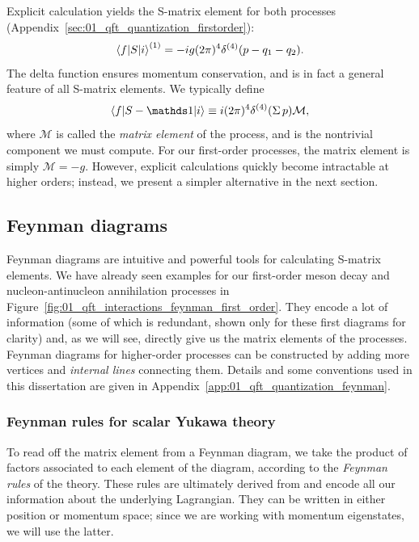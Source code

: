 Explicit calculation yields the S-matrix element for both processes (Appendix~\ref{sec:01_qft_quantization_firstorder}):
\begin{equation}
	\label{eq:01_qft_interactions_yukawa_smatrix_1}
	\braket{f|S|i}^{(1)} = -ig (2\pi)^4 \delta^{(4)}(p - q_1 - q_2).
\end{equation}
The delta function ensures momentum conservation, and is in fact a general feature of all S-matrix elements.
We typically define
\begin{equation}
	\label{eq:01_qft_interactions_matrix_element}
	\braket{f|S - \identity|i} \equiv i (2\pi)^4 \delta^{(4)}(\Sigma\,p) \mathcal M,
\end{equation}
where $\mathcal M$ is called the \textit{matrix element} of the process, and is the nontrivial component we must compute.
For our first-order processes, the matrix element is simply $\mathcal M = -g$.
However, explicit calculations quickly become intractable at higher orders; instead, we present a simpler alternative in the next section.

\subsection{Feynman diagrams}
\label{sec:01_qft_interactions_feynman}

Feynman diagrams are intuitive and powerful tools for calculating S-matrix elements. 
We have already seen examples for our first-order meson decay and nucleon-antinucleon annihilation processes in Figure~\ref{fig:01_qft_interactions_feynman_first_order}.
They encode a lot of information (some of which is redundant, shown only for these first diagrams for clarity) and, as we will see, directly give us the matrix elements of the processes.
Feynman diagrams for higher-order processes can be constructed by adding more vertices and \textit{internal lines} connecting them.
Details and some conventions used in this dissertation are given in Appendix~\ref{app:01_qft_quantization_feynman}.


\subsubsection{Feynman rules for scalar Yukawa theory}

To read off the matrix element from a Feynman diagram, we take the product of factors associated to each element of the diagram, according to the \textit{Feynman rules} of the theory.
These rules are ultimately derived from and encode all our information about the underlying Lagrangian.
They can be written in either position or momentum space; since we are working with momentum eigenstates, we will use the latter.


